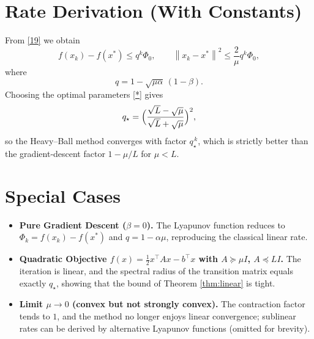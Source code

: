 \documentclass{article}
\newcommand{\norm}[1]{\left\lVert #1\right\rVert}
\begin{document}
\section*{Rate Derivation (With Constants)}
From \eqref{19} we obtain
\[
f(x_{k})-f(x^{*})\le q^{k}\Phi_{0},\qquad
\norm{x_{k}-x^{*}}^{2}\le \frac{2}{\mu}q^{k}\Phi_{0},
\]
where
\[
q=1-\sqrt{\mu\alpha}\,(1-\beta).
\]
Choosing the optimal parameters \eqref{*} gives
\[
q_{\star}= \Bigl(\frac{\sqrt{L}-\sqrt{\mu}}{\sqrt{L}+\sqrt{\mu}}\Bigr)^{2},
\]
so the Heavy–Ball method converges with factor $q_{\star}^{\,k}$, which is strictly better than the gradient‑descent factor $1-\mu/L$ for $\mu<L$.

\section*{Special Cases}
\begin{itemize}
\item \textbf{Pure Gradient Descent ($\beta=0$).}  
The Lyapunov function reduces to $\Phi_{k}=f(x_{k})-f(x^{*})$ and $q=1-\alpha\mu$, reproducing the classical linear rate.
\item \textbf{Quadratic Objective $f(x)=\tfrac12 x^{\top}Ax-b^{\top}x$ with $A\succeq\mu I$, $A\preceq L I$.}  
The iteration is linear, and the spectral radius of the transition matrix equals exactly $q_{\star}$, showing that the bound of Theorem \ref{thm:linear} is tight.
\item \textbf{Limit $\mu\to0$ (convex but not strongly convex).}  
The contraction factor tends to $1$, and the method no longer enjoys linear convergence; sublinear rates can be derived by alternative Lyapunov functions (omitted for brevity).
\end{itemize}
\end{document}
